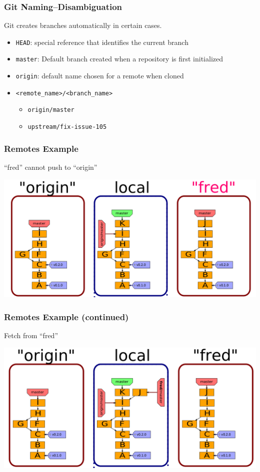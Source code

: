 \documentclass[english,compress]{beamer}
\begin{document}
\begin{frame}[fragile]
    \frametitle{Git Naming--Disambiguation}
    Git creates branches automatically in certain cases.
    \begin{itemize}
        \item \verb|HEAD|: special reference that identifies the current branch
        \item \verb|master|: Default branch created when a repository is first 
            initialized
        \item \verb|origin|: default name chosen for a remote when cloned
        \item \verb|<remote_name>/<branch_name>|
            \begin{itemize}
                \item \verb|origin/master|
                \item \verb|upstream/fix-issue-105|
            \end{itemize}
    \end{itemize}
\end{frame}

\begin{frame}[fragile]
    \frametitle{Remotes Example}
	``fred'' cannot push to ``origin''

	\begin{center}
		\includegraphics[width=.8\textwidth]{figs/several-remotes}
	\end{center}
\end{frame}

\begin{frame}[fragile]
    \frametitle{Remotes Example (continued)}
	Fetch from ``fred''

	\begin{center}
		\includegraphics[width=.8\textwidth]{figs/fetch-fred}
	\end{center}
\end{frame}
\end{document}
